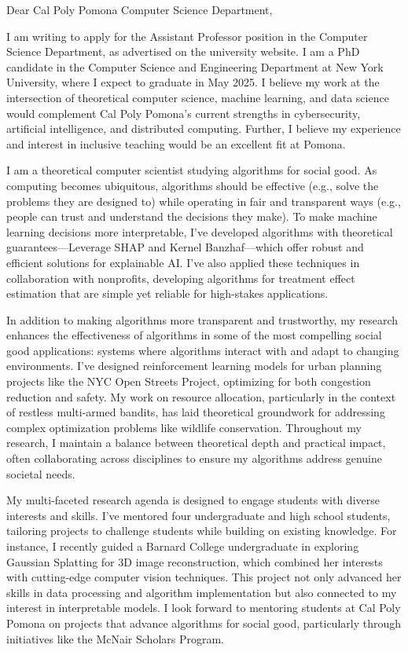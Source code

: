 \documentclass[11pt]{article}
\begin{document}
{\setlength{\parindent}{0cm}

Dear Cal Poly Pomona Computer Science Department,

I am writing to apply for the Assistant Professor position in the Computer Science Department, as advertised on the university website. I am a PhD candidate in the Computer Science and Engineering Department at New York University, where I expect to graduate in May 2025. I believe my work at the intersection of theoretical computer science, machine learning, and data science would complement Cal Poly Pomona’s current strengths in cybersecurity, artificial intelligence, and distributed computing. Further, I believe my experience and interest in inclusive teaching would be an excellent fit at Pomona.

I am a theoretical computer scientist studying algorithms for social good. As computing becomes ubiquitous, algorithms should be effective (e.g., solve the problems they are designed to) while operating in fair and transparent ways (e.g., people can trust and understand the decisions they make). To make machine learning decisions more interpretable, I’ve developed algorithms with theoretical guarantees—Leverage SHAP and Kernel Banzhaf—which offer robust and efficient solutions for explainable AI. I’ve also applied these techniques in collaboration with nonprofits, developing algorithms for treatment effect estimation that are simple yet reliable for high-stakes applications.

In addition to making algorithms more transparent and trustworthy, my research enhances the effectiveness of algorithms in some of the most compelling social good applications: systems where algorithms interact with and adapt to changing environments. I’ve designed reinforcement learning models for urban planning projects like the NYC Open Streets Project, optimizing for both congestion reduction and safety. My work on resource allocation, particularly in the context of restless multi-armed bandits, has laid theoretical groundwork for addressing complex optimization problems like wildlife conservation. Throughout my research, I maintain a balance between theoretical depth and practical impact, often collaborating across disciplines to ensure my algorithms address genuine societal needs.

My multi-faceted research agenda is designed to engage students with diverse interests and skills. I've mentored four undergraduate and high school students, tailoring projects to challenge students while building on existing knowledge. For instance, I recently guided a Barnard College undergraduate in exploring Gaussian Splatting for 3D image reconstruction, which combined her interests with cutting-edge computer vision techniques. This project not only advanced her skills in data processing and algorithm implementation but also connected to my interest in interpretable models. I look forward to mentoring students at Cal Poly Pomona on projects that advance algorithms for social good, particularly through initiatives like the McNair Scholars Program.

}
\end{document}
